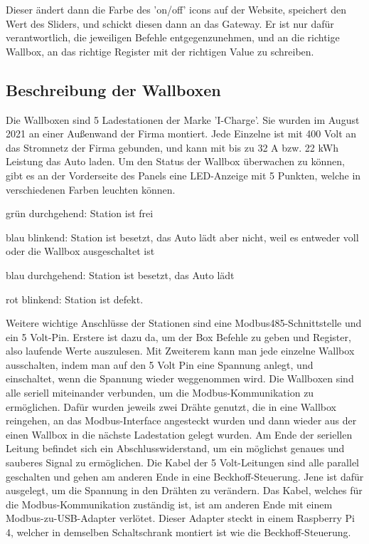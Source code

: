 Dieser ändert dann die Farbe des 'on/off' icons auf der Website, speichert den Wert des Sliders, und schickt diesen dann an das Gateway. Er ist nur dafür verantwortlich, die jeweiligen Befehle entgegenzunehmen, und an die richtige Wallbox, an das richtige Register mit der richtigen Value zu schreiben.





\subsection{Beschreibung der Wallboxen} 

Die Wallboxen sind 5 Ladestationen der Marke 'I-Charge'. Sie wurden im August 2021 an einer Außenwand der Firma montiert. Jede Einzelne ist mit 400 Volt an das Stromnetz der Firma gebunden, und kann mit bis zu 32 A bzw. 22 kWh Leistung das Auto laden. Um den Status der Wallbox überwachen zu können, gibt es an der Vorderseite des Panels eine LED-Anzeige mit 5 Punkten, welche in verschiedenen Farben leuchten können.

\begin{compactitem}
  \item grün durchgehend: Station ist frei
  \item blau blinkend: Station ist besetzt, das Auto lädt aber nicht, weil es entweder voll oder die Wallbox ausgeschaltet ist
  \item blau durchgehend: Station ist besetzt, das Auto lädt
  \item rot blinkend: Station ist defekt.

\end{compactitem}

Weitere wichtige Anschlüsse der Stationen sind eine Modbus485-Schnittstelle und ein 5 Volt-Pin.
Erstere ist dazu da, um der Box Befehle zu geben und Register, also laufende Werte auszulesen. Mit Zweiterem kann man jede einzelne Wallbox ausschalten, indem man auf den 5 Volt Pin eine Spannung anlegt, und einschaltet, wenn die Spannung wieder weggenommen wird.
Die Wallboxen sind alle seriell miteinander verbunden, um die Modbus-Kommunikation zu ermöglichen. Dafür wurden jeweils zwei Drähte genutzt, die in eine Wallbox reingehen, an das Modbus-Interface angesteckt wurden und dann wieder aus der einen Wallbox in die nächste Ladestation gelegt wurden. Am Ende der seriellen Leitung befindet sich ein Abschlusswiderstand, um ein möglichst genaues und sauberes Signal zu ermöglichen. Die Kabel der 5 Volt-Leitungen sind alle parallel geschalten und gehen am anderen Ende in eine Beckhoff-Steuerung. Jene ist dafür ausgelegt, um die Spannung in den Drähten zu verändern.
Das Kabel, welches für die Modbus-Kommunikation zuständig ist, ist am anderen Ende mit einem Modbus-zu-USB-Adapter verlötet. Dieser Adapter steckt in einem Raspberry Pi 4, welcher in demselben Schaltschrank montiert ist wie die Beckhoff-Steuerung.

